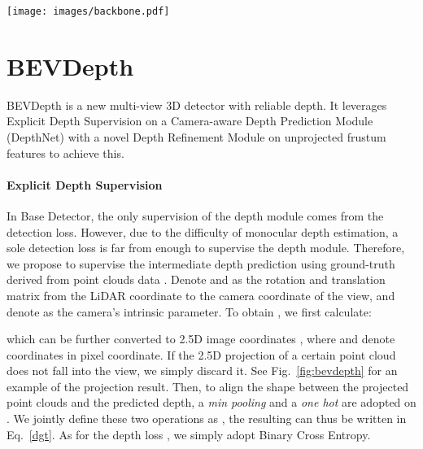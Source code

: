 \documentclass[twocolumn,letterpaper]{article}
\begin{document}
\begin{figure*}[t]
\texttt{[image: images/backbone.pdf]}
\centering
\caption{Framework of BEVDepth. Image backbone extracts image feature from multi-view images. Depth net takes Image feature as input, generates context and depth, and gets the final point feature. Voxel Pooling unifies all point features into one coordinate system and pools them onto the BEV feature map.}
\label{fig:bevdepth}
\end{figure*}



\section{BEVDepth}\label{sec4}

BEVDepth is a new multi-view 3D detector with reliable depth. It leverages Explicit Depth Supervision on a Camera-aware Depth Prediction Module (DepthNet) with a novel Depth Refinement Module on unprojected frustum features to achieve this.

\paragraph{Explicit Depth Supervision} In Base Detector, the only supervision of the depth module comes from the detection loss. However, due to the difficulty of monocular depth estimation, a sole detection loss is far from enough to supervise the depth module. Therefore, we propose to supervise the intermediate depth prediction  using ground-truth  derived from point clouds data . Denote  and  as the rotation and translation matrix from the LiDAR coordinate to the camera coordinate of the  view, and denote  as the  camera's intrinsic parameter. To obtain , we first calculate:



\noindent which can be further converted to 2.5D image coordinates , where  and  denote coordinates in pixel coordinate. If the 2.5D projection of a certain point cloud does not fall into the  view, we simply discard it. See Fig.~\ref{fig:bevdepth} for an example of the projection result. Then, to align the shape between the projected point clouds and the predicted depth, a \textit{min pooling} and a \textit{one hot} are adopted on . We jointly define these two operations as , the resulting  can thus be written in Eq.~\ref{dgt}. As for the depth loss , we simply adopt Binary Cross Entropy. 
\end{document}
